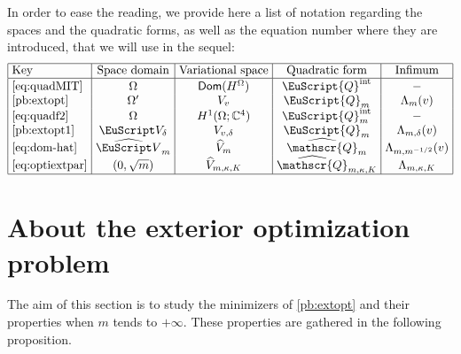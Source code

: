\documentclass[JEP,XML,SOM,Unicode]{cedram}
\let\mathcal \EuScript
\newcommand{\scrQ}{\mathscr{Q}}
\newcommand{\cQ}{\mathcal{Q}}
\newcommand{\intt}{\mathrm{int}}
\theoremstyle{plain}
\theoremstyle{definition}
\newcommand{\CC}{\mathbb{C}}
\DeclareMathOperator{\Dom}{\mathsf{Dom}}
\begin{document}
In order to ease the reading, we provide here a list of notation regarding the spaces and the quadratic forms, as well as the equation number where they are introduced, that we will use in the sequel:
\[\arraycolsep3.5pt
\begin{array}{|l|c|c|c|c|}
\hline
\mbox{Key}&\mbox{Space domain} &\mbox{Variational space}& \mbox{Quadratic form}&\mbox{Infimum}\\
\hline
\mbox{\eqref{eq:quadMIT}}&\Omega &\Dom(H^\Omega)&\cQ^\intt&-\\
\mbox{\eqref{pb:extopt}}&\Omega' &V_v&\cQ_m&\Lambda_m(v)\\
\mbox{\eqref{eq:quadf2}}&\Omega &H^1(\Omega; \CC^4)&\cQ_m^\intt&-\\
\mbox{\eqref{pb:extopt1}}&\mathcal V_{\delta} &V_{v,\delta}& \cQ_{m}& \Lambda_{m,\delta}(v)\\
\mbox{\eqref{eq:dom-hat}}&\widehat{\mathcal V}_{m} &\widehat V_{m} &\widehat{\scrQ}_{m}&\Lambda_{m,m^{-1/2}}(v)\\
\mbox{\eqref{eq:optiextpar}}&(0,\sqrt{m}) & \widehat{V}_{m,\kappa,K} & \widehat{\scrQ}_{m,\kappa,K}& \Lambda_{m,\kappa,K} \\
\hline
\end{array}
\]

\section{About the exterior optimization problem}\label{sec.2}
The aim of this section is to study the minimizers of \eqref{pb:extopt} and their properties when $m$ tends to $+\infty$. These properties are gathered in the following proposition.
\end{document}
